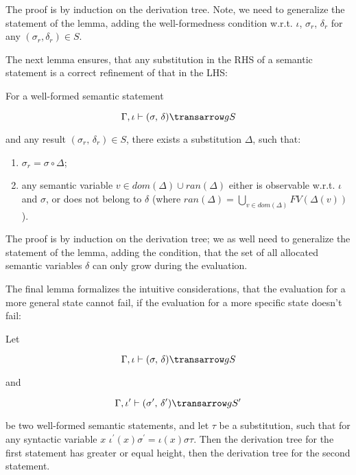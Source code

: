 The proof is by induction on the derivation tree. Note, we need to generalize the statement of the lemma, adding the well-formedness
condition w.r.t. $\iota$, $\sigma_r$, $\delta_r$ for any $(\sigma_r, \delta_r) \in S$.

The next lemma ensures, that any substitution in the RHS of a semantic statement is a correct refinement of that in the LHS:

\begin{lemma}
\label{two}
\normalfont
For a well-formed semantic statement 

$$
\otrans{\Gamma,\iota}{(\sigma,\,\delta)}{g}{S}
$$ 

\noindent and any result \mbox{$(\sigma_r,\,\delta_r) \in S$}, there exists a substitution $\Delta$, such that:
  \begin{enumerate}
    \item \mbox{$\sigma_r = \sigma\circ\Delta$};
    \item any semantic variable \mbox{$v\in dom(\Delta)\cup ran(\Delta)$} either is observable w.r.t. $\iota$ and $\sigma$,
 or does not belong to $\delta$ (where \mbox{$ran(\Delta)=\bigcup_{v\in dom(\Delta)}FV(\Delta(v))$}).
  \end{enumerate}   
\end{lemma}

The proof is by induction on the derivation tree; we as well need to generalize the statement of the lemma, adding the condition, that the 
set of all allocated semantic variables $\delta$ can only grow during the evaluation.

The final lemma formalizes the intuitive considerations, that the evaluation for a more general state cannot fail, if the evaluation 
for a more specific state doesn't fail:

\begin{lemma}
\label{three}
\normalfont
Let 

$$
\otrans{\Gamma,\iota}{(\sigma,\,\delta)}{g}{S}
$$ 

and 

$$\otrans{\Gamma,\iota^\prime}{(\sigma^\prime,\,\delta^\prime)}{g}{S^\prime}
$$

\noindent be two well-formed semantic statements, and let $\tau$ be a substitution, such that 
for any syntactic variable $x$ \mbox{$\iota^\prime(x) \sigma^\prime = \iota(x) \sigma \tau$}. Then the 
derivation tree for the first statement has greater or equal height, then the derivation 
tree for the second statement.
\end{lemma}


